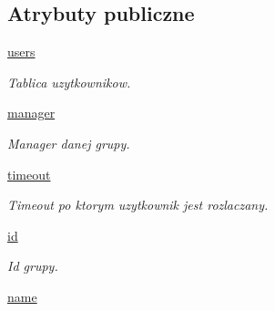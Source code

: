 \subsection*{Atrybuty publiczne}
\begin{CompactItemize}
\item 
\hypertarget{class_serv_1_1_group_1_1_group_8da1d96bcde84573f936683336b10064}{
\hyperlink{class_serv_1_1_group_1_1_group_8da1d96bcde84573f936683336b10064}{users}}
\label{class_serv_1_1_group_1_1_group_8da1d96bcde84573f936683336b10064}

\begin{CompactList}\small\item\em Tablica uzytkownikow. \item\end{CompactList}\item 
\hypertarget{class_serv_1_1_group_1_1_group_d89e6d491f6237fb219f1affca48684b}{
\hyperlink{class_serv_1_1_group_1_1_group_d89e6d491f6237fb219f1affca48684b}{manager}}
\label{class_serv_1_1_group_1_1_group_d89e6d491f6237fb219f1affca48684b}

\begin{CompactList}\small\item\em Manager danej grupy. \item\end{CompactList}\item 
\hypertarget{class_serv_1_1_group_1_1_group_87949bedd26e03b7117116b517d239de}{
\hyperlink{class_serv_1_1_group_1_1_group_87949bedd26e03b7117116b517d239de}{timeout}}
\label{class_serv_1_1_group_1_1_group_87949bedd26e03b7117116b517d239de}

\begin{CompactList}\small\item\em Timeout po ktorym uzytkownik jest rozlaczany. \item\end{CompactList}\item 
\hypertarget{class_serv_1_1_group_1_1_group_bfb82fc7970fba46ba77edf1fae41dea}{
\hyperlink{class_serv_1_1_group_1_1_group_bfb82fc7970fba46ba77edf1fae41dea}{id}}
\label{class_serv_1_1_group_1_1_group_bfb82fc7970fba46ba77edf1fae41dea}

\begin{CompactList}\small\item\em Id grupy. \item\end{CompactList}\item 
\hypertarget{class_serv_1_1_group_1_1_group_0b9cb49f5d6e2b732f8b4b4ea685999d}{
\hyperlink{class_serv_1_1_group_1_1_group_0b9cb49f5d6e2b732f8b4b4ea685999d}{name}}
\label{class_serv_1_1_group_1_1_group_0b9cb49f5d6e2b732f8b4b4ea685999d}


\end{CompactItemize}
